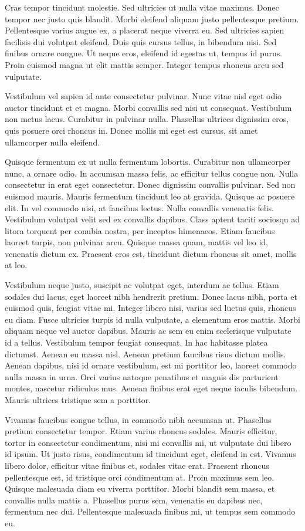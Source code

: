 Cras tempor tincidunt molestie. Sed ultricies ut nulla vitae maximus. Donec tempor nec justo quis blandit. Morbi eleifend aliquam justo pellentesque pretium. Pellentesque varius augue ex, a placerat neque viverra eu. Sed ultricies sapien facilisis dui volutpat eleifend. Duis quis cursus tellus, in bibendum nisi. Sed finibus ornare congue. Ut neque eros, eleifend id egestas ut, tempus id purus. Proin euismod magna ut elit mattis semper. Integer tempus rhoncus arcu sed vulputate.

Vestibulum vel sapien id ante consectetur pulvinar. Nunc vitae nisl eget odio auctor tincidunt et et magna. Morbi convallis sed nisi ut consequat. Vestibulum non metus lacus. Curabitur in pulvinar nulla. Phasellus ultrices dignissim eros, quis posuere orci rhoncus in. Donec mollis mi eget est cursus, sit amet ullamcorper nulla eleifend.

Quisque fermentum ex ut nulla fermentum lobortis. Curabitur non ullamcorper nunc, a ornare odio. In accumsan massa felis, ac efficitur tellus congue non. Nulla consectetur in erat eget consectetur. Donec dignissim convallis pulvinar. Sed non euismod mauris. Mauris fermentum tincidunt leo at gravida. Quisque ac posuere elit. In vel commodo nisi, at faucibus lectus. Nulla convallis venenatis felis. Vestibulum volutpat velit sed ex convallis dapibus. Class aptent taciti sociosqu ad litora torquent per conubia nostra, per inceptos himenaeos. Etiam faucibus laoreet turpis, non pulvinar arcu. Quisque massa quam, mattis vel leo id, venenatis dictum ex. Praesent eros est, tincidunt dictum rhoncus sit amet, mollis at leo.

Vestibulum neque justo, suscipit ac volutpat eget, interdum ac tellus. Etiam sodales dui lacus, eget laoreet nibh hendrerit pretium. Donec lacus nibh, porta et euismod quis, feugiat vitae mi. Integer libero nisi, varius sed luctus quis, rhoncus eu diam. Fusce ultricies turpis id nulla vulputate, a elementum eros mattis. Morbi aliquam neque vel auctor dapibus. Mauris ac sem eu enim scelerisque vulputate id a tellus. Vestibulum tempor feugiat consequat. In hac habitasse platea dictumst. Aenean eu massa nisl. Aenean pretium faucibus risus dictum mollis. Aenean dapibus, nisi id ornare vestibulum, est mi porttitor leo, laoreet commodo nulla massa in urna. Orci varius natoque penatibus et magnis dis parturient montes, nascetur ridiculus mus. Aenean finibus erat eget neque iaculis bibendum. Mauris ultrices tristique sem a porttitor.

Vivamus faucibus congue tellus, in commodo nibh accumsan ut. Phasellus pretium consectetur tempor. Etiam varius rhoncus sodales. Mauris efficitur, tortor in consectetur condimentum, nisi mi convallis mi, ut vulputate dui libero id ipsum. Ut justo risus, condimentum id tincidunt eget, eleifend in est. Vivamus libero dolor, efficitur vitae finibus et, sodales vitae erat. Praesent rhoncus pellentesque est, id tristique orci condimentum at. Proin maximus sem leo. Quisque malesuada diam eu viverra porttitor. Morbi blandit sem massa, et convallis nulla mattis a. Phasellus purus sem, venenatis eu dapibus nec, fermentum nec dui. Pellentesque malesuada finibus mi, ut tempus sem commodo eu.

